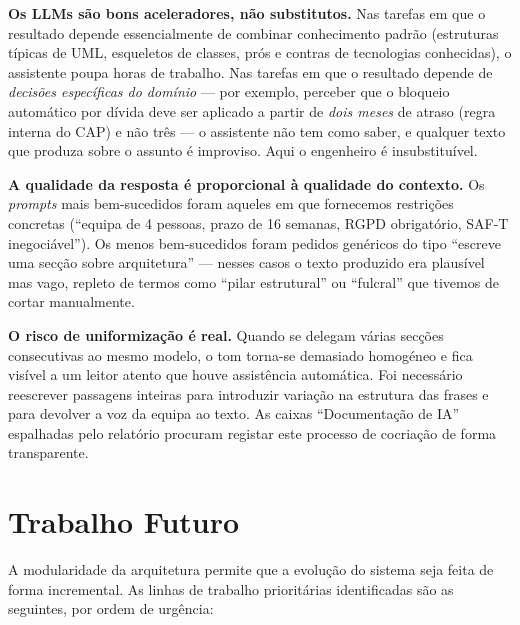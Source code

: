 \textbf{Os LLMs são bons aceleradores, não substitutos.} Nas tarefas em que o resultado depende essencialmente de combinar conhecimento padrão (estruturas típicas de UML, esqueletos de classes, prós e contras de tecnologias conhecidas), o assistente poupa horas de trabalho. Nas tarefas em que o resultado depende de \emph{decisões específicas do domínio} --- por exemplo, perceber que o bloqueio automático por dívida deve ser aplicado a partir de \emph{dois meses} de atraso (regra interna do CAP) e não três --- o assistente não tem como saber, e qualquer texto que produza sobre o assunto é improviso. Aqui o engenheiro é insubstituível.

\textbf{A qualidade da resposta é proporcional à qualidade do contexto.} Os \textit{prompts} mais bem-sucedidos foram aqueles em que fornecemos restrições concretas (``equipa de 4 pessoas, prazo de 16 semanas, RGPD obrigatório, SAF-T inegociável''). Os menos bem-sucedidos foram pedidos genéricos do tipo ``escreve uma secção sobre arquitetura'' --- nesses casos o texto produzido era plausível mas vago, repleto de termos como ``pilar estrutural'' ou ``fulcral'' que tivemos de cortar manualmente.

\textbf{O risco de uniformização é real.} Quando se delegam várias secções consecutivas ao mesmo modelo, o tom torna-se demasiado homogéneo e fica visível a um leitor atento que houve assistência automática. Foi necessário reescrever passagens inteiras para introduzir variação na estrutura das frases e para devolver a voz da equipa ao texto. As caixas ``Documentação de IA'' espalhadas pelo relatório procuram registar este processo de cocriação de forma transparente.

\section{Trabalho Futuro}

A modularidade da arquitetura permite que a evolução do sistema seja feita de forma incremental. As linhas de trabalho prioritárias identificadas são as seguintes, por ordem de urgência:

